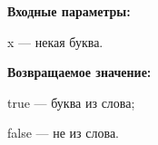 \textbf{Входные параметры:}

x --- некая буква.

\textbf{Возвращаемое значение:}
 
true --- буква из слова;

false --- не из слова.
